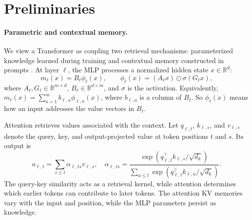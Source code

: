 \section{Preliminaries}\label{sec:preliminaries}

\paragraph{Parametric and contextual memory.}
We view a Transformer as coupling two retrieval mechanisms:
parameterized knowledge learned during training and contextual memory constructed in prompts
\citep{irie2022dual,zhong2025understandingtransformerperspectiveassociative}.
At layer $\ell$, the MLP processes a normalized hidden state $x\in\mathbb{R}^{d}$:
\begin{equation}
    m_\ell(x)=B_\ell\phi_\ell(x),\qquad
    \phi_\ell(x)=(A_\ell x)\odot\sigma(G_\ell x),
    \label{eq:mlp_assoc}
\end{equation}
where $A_\ell,G_\ell\in\mathbb{R}^{m\times d}$,
$B_\ell\in\mathbb{R}^{d\times m}$, and $\sigma$ is the
activation. Equivalently, $m_\ell(x)=\sum_{a=1}^{m}b_{\ell,a}
\phi_{\ell,a}(x)$, where $b_{\ell,a}$ is a column of $B_\ell$. So $\phi_\ell(x)$ means how an input addresses the
value vectors in $B_\ell$.

Attention retrieves values associated with the context. Let $q_{\ell,t}$,
$k_{\ell,s}$, and $v_{\ell,s}$ denote the query, key, and
output-projected value at token positions $t$ and $s$. Its output is
\begin{equation}
 a_{\ell,t}=\sum_{s\le t}\alpha_{\ell,ts}v_{\ell,s},\quad
 \alpha_{\ell,ts}=
 \frac{\exp(q_{\ell,t}^{\top}k_{\ell,s}/\sqrt{d_k})}
 {\sum_{u\le t}\exp(q_{\ell,t}^{\top}k_{\ell,u}/\sqrt{d_k})}.
 \label{eq:attn_assoc}
\end{equation}
The query-key similarity acts as a retrieval kernel,
while attention determines which earlier tokens can
contribute to later tokens.
The attention KV memories vary with the input and position, while
the MLP parameters persist as knowledge.

